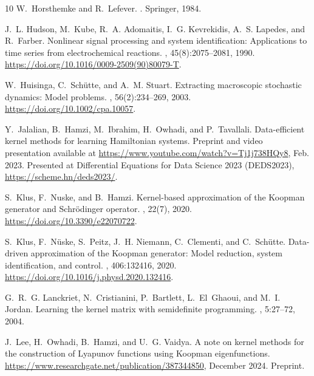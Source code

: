 \begin{thebibliography}{10}
W.~Horsthemke and R.~Lefever.
.
\newblock Springer, 1984.

J.~L. Hudson, M.~Kube, R.~A. Adomaitis, I.~G. Kevrekidis, A.~S. Lapedes, and
  R.~Farber.
\newblock Nonlinear signal processing and system identification: {A}pplications
  to time series from electrochemical reactions.
, 45(8):2075--2081, 1990.
\newblock \url{https://doi.org/10.1016/0009-2509(90)80079-T}.

W.~Huisinga, C.~Sch{\"u}tte, and A.~M. Stuart.
\newblock Extracting macroscopic stochastic dynamics: Model problems.
, 56(2):234--269, 2003.
\newblock \url{https://doi.org/10.1002/cpa.10057}.

Y.~Jalalian, B.~Hamzi, M.~Ibrahim, H.~Owhadi, and P.~Tavallali.
\newblock Data-efficient kernel methods for learning {H}amiltonian systems.
\newblock Preprint and video presentation available at
  \url{https://www.youtube.com/watch?v=Tj1j738HQy8}, Feb. 2023.
\newblock Presented at Differential Equations for Data Science 2023 (DEDS2023),
  \url{https://scheme.hn/deds2023/}.

S.~Klus, F.~Nuske, and B.~Hamzi.
\newblock Kernel-based approximation of the {K}oopman generator and
  {S}chr{\"o}dinger operator.
, 22(7), 2020.
\newblock \url{https://doi.org/10.3390/e22070722}.

S.~Klus, F.~N\"uske, S.~Peitz, J.~H. Niemann, C.~Clementi, and C.~Sch\"utte.
\newblock Data-driven approximation of the {K}oopman generator: Model
  reduction, system identification, and control.
, 406:132416, 2020.
\newblock \url{https://doi.org/10.1016/j.physd.2020.132416}.

G.~R.~G. Lanckriet, N.~Cristianini, P.~Bartlett, L.~El~Ghaoui, and M.~I.
  Jordan.
\newblock Learning the kernel matrix with semidefinite programming.
, 5:27--72, 2004.

J.~Lee, H.~Owhadi, B.~Hamzi, and U.~G. Vaidya.
\newblock A note on kernel methods for the construction of {L}yapunov functions
  using {K}oopman eigenfunctions.
\newblock \url{https://www.researchgate.net/publication/387344850}, December
  2024.
\newblock Preprint.


\end{thebibliography}
